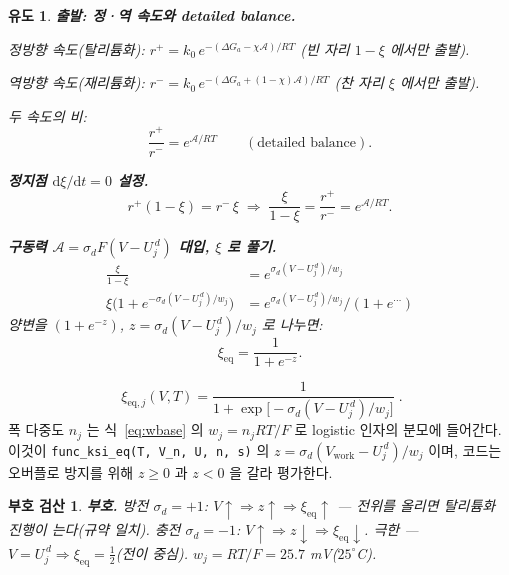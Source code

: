 \documentclass[11pt,a4paper]{article}
\newtheorem*{signbox}{부호 검산}
\newtheorem*{derivebox}{유도}
\newcommand{\dd}{\mathrm{d}}
\newcommand{\eq}{\mathrm{eq}}
\newcommand{\work}{\mathrm{work}}
\newcommand{\code}[1]{\texttt{#1}}
\begin{document}
\begin{derivebox}
\textbf{출발: 정·역 속도와 detailed balance.}

정방향 속도(탈리튬화): $r^+=k_0\,e^{-(\Delta G_{a}-\chi\mathcal A)/RT}$ (빈 자리 $1-\xi$ 에서만 출발).

역방향 속도(재리튬화): $r^-=k_0\,e^{-(\Delta G_{a}+(1-\chi)\mathcal A)/RT}$ (찬 자리 $\xi$ 에서만 출발).

두 속도의 비:
\begin{equation*}
\frac{r^+}{r^-}=e^{\mathcal A/RT}\qquad(\text{detailed balance}).
\end{equation*}

\textbf{정지점 $\dd\xi/\dd t=0$ 설정.}
\begin{equation*}
r^+(1-\xi)=r^-\,\xi
\;\Longrightarrow\;
\frac{\xi}{1-\xi}=\frac{r^+}{r^-}=e^{\mathcal A/RT}.
\end{equation*}

\textbf{구동력 $\mathcal A=\sigma_d F(V-U_j^{\,d})$ 대입, $\xi$ 로 풀기.}
\begin{align*}
\frac{\xi}{1-\xi}&=e^{\sigma_d(V-U_j^{\,d})/w_j}\\
\xi\big(1+e^{-\sigma_d(V-U_j^{\,d})/w_j}\big)&=e^{\sigma_d(V-U_j^{\,d})/w_j}/(1+e^{\cdots})
\end{align*}
양변을 $(1+e^{-z})$, $z=\sigma_d(V-U_j^{\,d})/w_j$ 로 나누면:
\begin{equation*}
\xi_\eq=\frac{1}{1+e^{-z}}.
\end{equation*}
\end{derivebox}
\begin{equation}
\boxed{\;\xi_{\eq,j}(V,T)=\frac{1}{1+\exp\!\big[-\sigma_d(V-U_j^{\,d})/w_j\big]}\;.}
\label{eq:xieq}
\end{equation}
폭 다중도 $n_j$ 는 식~\eqref{eq:wbase} 의 $w_j=n_jRT/F$ 로 logistic 인자의 분모에 들어간다. 이것이
\code{func\_ksi\_eq(T, V\_n, U, n, s)} 의 $z=\sigma_d(V_\work-U_j^{\,d})/w_j$ 이며, 코드는 오버플로 방지를 위해
$z\ge0$ 과 $z<0$ 을 갈라 평가한다.

\begin{signbox}
\textbf{부호.} 방전 $\sigma_d=+1$: $V\!\uparrow\Rightarrow z\!\uparrow\Rightarrow\xi_\eq\!\uparrow$ — 전위를 올리면
탈리튬화 진행이 는다(규약 일치). 충전 $\sigma_d=-1$: $V\!\uparrow\Rightarrow z\!\downarrow\Rightarrow\xi_\eq\!\downarrow$.
극한 — $V=U_j^{\,d}\Rightarrow\xi_\eq=\tfrac12$(전이 중심). $w_j=RT/F=25.7$ mV($25^\circ$C).
\end{signbox}
\end{document}
